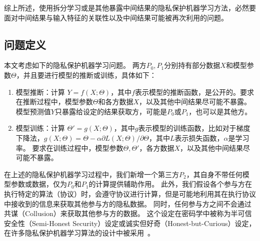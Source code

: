综上所述，使用拆分学习或是其他暴露中间结果的隐私保护机器学习方法，必然要面对中间结果与输入特征的关联性以及中间结果可能被再次利用的问题。


\subsection{问题定义}
本文考虑如下的隐私保护机器学习问题。
两方$P_0, P_1$分别持有部分数据$X$和模型参数$\Theta$，并且要进行模型的推断或训练，具体如下：
\begin{enumerate}[label=(\arabic*)]
    \item 模型推断：计算 $Y = f(X; \Theta)$，其中$f$表示模型的推断函数，是公开的。要求在推断过程中，模型参数$\Theta$和各方数据$X$，以及其他中间结果尽可能不暴露。
    模型预测值$Y$只暴露给设定的结果获取方，可能是$P_0$或$P_1$，也可以是其他方。
    \item 模型训练：计算 $\Theta' = g(X; \Theta)$，其中$g$表示模型的训练函数，比如对于梯度下降法，$g(X;\Theta) = \Theta - \alpha \partial L(X;\Theta) / \partial \Theta$，其中$L$表示损失函数，$\alpha$是学习率。
    要求在训练过程中，模型参数$\Theta, \Theta'$，各方数据$X$，以及其他中间结果尽可能不暴露。
\end{enumerate}

在上述的隐私保护机器学习过程中，我们新增一个第三方$P_2$，其自身不带任何模型参数或数据，仅为$P_0$和$P_1$的计算提供辅助作用。
此外，我们假设各个参与方在执行特定的算法（协议）时，会遵守协议进行计算，但是可能地利用其在执行协议中接收到的信息来获取其他参与方的隐私数据。
同时，任何参与方之间不会通过共谋（Collusion）来获取其他参与方的数据。
%
这个设定在密码学中被称为半可信安全性（Semi-Honest Security）设定或诚实但好奇（Honest-but-Curious）设定，在许多隐私保护机器学习算法的设计中被采用~\cite{wagh2019securenn,mohassel2018aby3,riazi_2018_chameleon}。